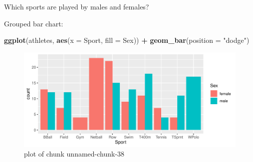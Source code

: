 \documentclass[ignorenonframetext,]{beamer}
\newenvironment{Shaded}{\begin{snugshade}}{\end{snugshade}}
\newcommand{\DataTypeTok}[1]{\textcolor[rgb]{0.13,0.29,0.53}{#1}}
\newcommand{\KeywordTok}[1]{\textcolor[rgb]{0.13,0.29,0.53}{\textbf{#1}}}
\newcommand{\NormalTok}[1]{#1}
\newcommand{\OperatorTok}[1]{\textcolor[rgb]{0.81,0.36,0.00}{\textbf{#1}}}
\newcommand{\StringTok}[1]{\textcolor[rgb]{0.31,0.60,0.02}{#1}}
\begin{document}
\begin{frame}[fragile]{Which sports are played by males and females?}
\protect\hypertarget{which-sports-are-played-by-males-and-females}{}

Grouped bar chart:

\begin{Shaded}
\begin{Highlighting}[]
\KeywordTok{ggplot}\NormalTok{(athletes, }\KeywordTok{aes}\NormalTok{(}\DataTypeTok{x =}\NormalTok{ Sport, }\DataTypeTok{fill =}\NormalTok{ Sex)) }\OperatorTok{+}
\StringTok{  }\KeywordTok{geom_bar}\NormalTok{(}\DataTypeTok{position =} \StringTok{"dodge"}\NormalTok{)}
\end{Highlighting}
\end{Shaded}

\begin{figure}
\centering
\includegraphics{figure/unnamed-chunk-38-1.pdf}
\caption{plot of chunk unnamed-chunk-38}
\end{figure}

\end{frame}
\end{document}
